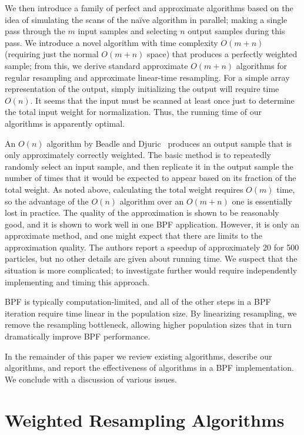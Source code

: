 \documentclass[12pt]{article}
\begin{document}
  We then introduce a family of perfect and approximate
  algorithms based on the idea of simulating the scans of
  the na\"ive algorithm in parallel; making a single pass
  through the $m$ input samples and selecting $n$ output
  samples during this pass.  We introduce a novel algorithm
  with time complexity $O(m + n)$ (requiring just the normal
  $O(m + n)$ space) that produces a perfectly weighted
  sample; from this, we derive standard approximate $O(m +
  n)$ algorithms for regular resampling and
  approximate linear-time resampling.  For a simple array representation of the
  output, simply initializing the output will require time
  $O(n)$.  It seems that the input must be scanned at least
  once just to determine the total input weight for
  normalization.  Thus, the running time of our algorithms
  is apparently optimal.

  An $O(n)$ algorithm by Beadle and Djuric~\cite{recount}
  produces an output sample that is only approximately
  correctly weighted.  The basic method is to repeatedly
  randomly select an input sample, and then replicate it in
  the output sample the number of times that it would be
  expected to appear based on its fraction of the total
  weight.  As noted above, calculating the total weight
  requires $O(m)$ time, so the advantage of the $O(n)$
  algorithm over an $O(m + n)$ one is essentially lost in
  practice.  The quality of the approximation is shown to be
  reasonably good, and it is shown to work well in one BPF
  application.  However, it is only an approximate method,
  and one might expect that there are limits to the
  approximation quality.  The authors report a speedup of
  approximately 20 for 500 particles, but no other details
  are given about running time.  We suspect that the
  situation is more complicated; to investigate further
  would require independently implementing and timing this
  approach.

  BPF is typically computation-limited, and all of the other
  steps in a BPF iteration require time linear in the
  population size.  By linearizing resampling, we remove the
  resampling bottleneck, allowing higher population
  sizes that in turn dramatically improve BPF performance.

  In the remainder of this paper we review existing
  algorithms, describe our algorithms, and report the
  effectiveness of algorithms in a BPF implementation.  We
  conclude with a discussion of various issues.

\section{Weighted Resampling Algorithms}
\end{document}
